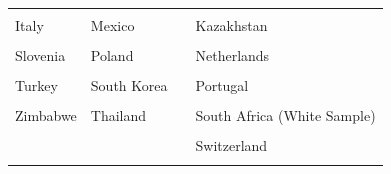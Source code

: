 \documentclass[
]{article}
\begin{document}
\begin{table}[ht]
\begin{tabular}[t]{>{}l>{}l>{}l>{}l}
\addlinespace
\textcolor[HTML]{739999}{\cellcolor{gray!6}{Israel}} & \textcolor[HTML]{000026}{\cellcolor{gray!6}{Malaysia}} & \textcolor[HTML]{407326}{\cellcolor{gray!6}{}} & \textcolor[HTML]{BF7300}{\cellcolor{gray!6}{Ireland}}\\
\textcolor[HTML]{739999}{Italy} & \textcolor[HTML]{000026}{Mexico} & \textcolor[HTML]{407326}{} & \textcolor[HTML]{BF7300}{Kazakhstan}\\
\textcolor[HTML]{739999}{\cellcolor{gray!6}{Philippines}} & \textcolor[HTML]{000026}{\cellcolor{gray!6}{Nigeria}} & \textcolor[HTML]{407326}{\cellcolor{gray!6}{}} & \textcolor[HTML]{BF7300}{\cellcolor{gray!6}{Namibia}}\\
\textcolor[HTML]{739999}{Slovenia} & \textcolor[HTML]{000026}{Poland} & \textcolor[HTML]{407326}{} & \textcolor[HTML]{BF7300}{Netherlands}\\
\textcolor[HTML]{739999}{\cellcolor{gray!6}{Spain}} & \textcolor[HTML]{000026}{\cellcolor{gray!6}{Russia}} & \textcolor[HTML]{407326}{\cellcolor{gray!6}{}} & \textcolor[HTML]{BF7300}{\cellcolor{gray!6}{New Zealand}}\\
\addlinespace
\textcolor[HTML]{739999}{Turkey} & \textcolor[HTML]{000026}{South Korea} & \textcolor[HTML]{407326}{} & \textcolor[HTML]{BF7300}{Portugal}\\
\textcolor[HTML]{739999}{\cellcolor{gray!6}{Zambia}} & \textcolor[HTML]{000026}{\cellcolor{gray!6}{Taiwan}} & \textcolor[HTML]{407326}{\cellcolor{gray!6}{}} & \textcolor[HTML]{BF7300}{\cellcolor{gray!6}{Singapore}}\\
\textcolor[HTML]{739999}{Zimbabwe} & \textcolor[HTML]{000026}{Thailand} & \textcolor[HTML]{407326}{} & \textcolor[HTML]{BF7300}{South Africa (White Sample)}\\
\textcolor[HTML]{739999}{\cellcolor{gray!6}{}} & \textcolor[HTML]{000026}{\cellcolor{gray!6}{Venezuela}} & \textcolor[HTML]{407326}{\cellcolor{gray!6}{}} & \textcolor[HTML]{BF7300}{\cellcolor{gray!6}{Sweden}}\\
\textcolor[HTML]{739999}{} & \textcolor[HTML]{000026}{} & \textcolor[HTML]{407326}{} & \textcolor[HTML]{BF7300}{Switzerland}\\
\addlinespace
\textcolor[HTML]{739999}{\cellcolor{gray!6}{}} & \textcolor[HTML]{000026}{\cellcolor{gray!6}{}} & \textcolor[HTML]{407326}{\cellcolor{gray!6}{}} & \textcolor[HTML]{BF7300}{\cellcolor{gray!6}{USA}}\\
\bottomrule
\end{tabular}
\end{table}
\end{document}

